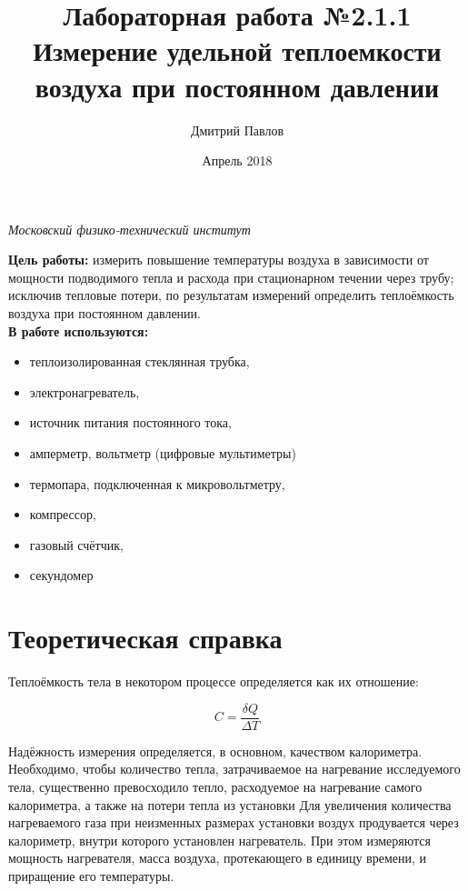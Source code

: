 \documentclass[a4paper,17pt]{article}
\title{Лабораторная работа №2.1.1\\
Измерение удельной теплоемкости воздуха при постоянном давлении}
\author{Дмитрий Павлов}
\date{Апрель 2018}
\begin{document}
\maketitle
\begin{center}	
    \textit{Московский физико-технический институт}
	\vspace{0.5ex} 
\end{center}

\textbf{Цель работы:} измерить повышение температуры воздуха в зависимости от мощности подводимого тепла и расхода при стационарном течении через трубу; исключив тепловые потери, по результатам измерений определить теплоёмкость воздуха при постоянном давлении.\\

\textbf{В работе используются:} 
\begin{itemize}
    \item теплоизолированная стеклянная трубка,
    \item электронагреватель,
    \item источник питания постоянного тока,
    \item амперметр, вольтметр (цифровые мультиметры)
    \item термопара, подключенная к микровольтметру,
    \item компрессор,
    \item газовый счётчик,
    \item секундомер
\end{itemize}

\newpage

\section{Теоретическая справка}

    Теплоёмкость тела в некотором процессе определяется как их отношение:
    
    \begin{equation}
        C = \frac{\delta Q}{\Delta T}
    \end{equation}
        
    Надёжность измерения определяется, в основном, качеством калориметра. Необходимо, чтобы количество тепла, затрачиваемое на нагревание исследуемого тела, существенно превосходило тепло, расходуемое на нагревание самого калориметра, а также на потери тепла из установки Для увеличения количества нагреваемого газа при неизменных размерах установки воздух продувается через калориметр, внутри которого установлен нагреватель. При этом измеряются мощность нагревателя, масса воздуха, протекающего в единицу времени, и приращение его температуры.
    
\end{document}
